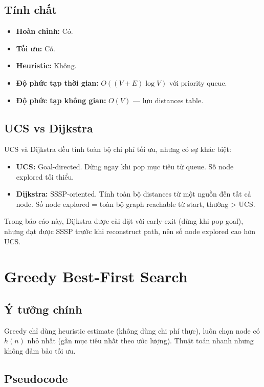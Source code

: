 \subsection{Tính chất}

\begin{itemize}
  \item \textbf{Hoàn chỉnh:} Có.
  \item \textbf{Tối ưu:} Có.
  \item \textbf{Heuristic:} Không.
  \item \textbf{Độ phức tạp thời gian:} $O((V + E) \log V)$ với priority queue.
  \item \textbf{Độ phức tạp không gian:} $O(V)$ --- lưu distances table.
\end{itemize}

\subsection{UCS vs Dijkstra}

UCS và Dijkstra đều tính toàn bộ chi phí tối ưu, nhưng có sự khác biệt:

\begin{itemize}
  \item \textbf{UCS:} Goal-directed. Dừng ngay khi pop mục tiêu từ queue. Số node explored tối thiểu.
  \item \textbf{Dijkstra:} SSSP-oriented. Tính toàn bộ distances từ một nguồn đến tất cả node. Số node explored = toàn bộ graph reachable từ start, thường > UCS.
\end{itemize}

Trong báo cáo này, Dijkstra được cài đặt với early-exit (dừng khi pop goal), nhưng đạt được SSSP trước khi reconstruct path, nên số node explored cao hơn UCS.

\section{Greedy Best-First Search}

\subsection{Ý tưởng chính}

Greedy chỉ dùng heuristic estimate (không dùng chi phí thực), luôn chọn node có $h(n)$ nhỏ nhất (gần mục tiêu nhất theo ước lượng). Thuật toán nhanh nhưng không đảm bảo tối ưu.

\subsection{Pseudocode}

